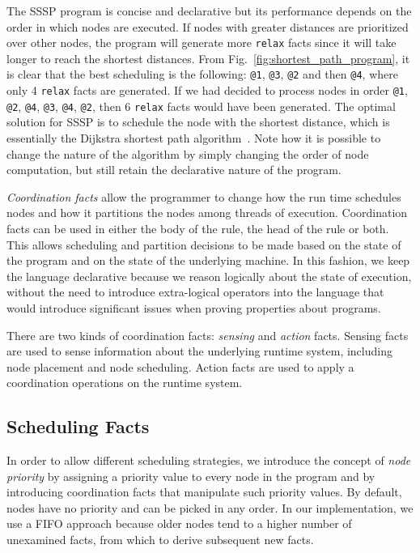 The SSSP program is concise and declarative but its performance depends on the order in which nodes are
executed. If nodes with greater distances are prioritized over other nodes, the
program will generate more \texttt{relax} facts since it will take longer to
reach the shortest distances. From Fig.~\ref{fig:shortest_path_program}, it is
clear that the best scheduling is the following: \texttt{@1},
\texttt{@3}, \texttt{@2} and then \texttt{@4}, where only 4 \texttt{relax}
facts are generated. If we had decided to process nodes in order
\texttt{@1}, \texttt{@2}, \texttt{@4}, \texttt{@3}, \texttt{@4},
\texttt{@2}, then 6 \texttt{relax} facts would have been generated.
The optimal solution for SSSP is to schedule the node with the
shortest distance, which is essentially the Dijkstra shortest path
algorithm~\cite{Dijkstra}. Note how it is possible to change the nature of
the algorithm by simply changing the order of node computation, but still
retain the declarative nature of the program.

\emph{Coordination facts} allow the programmer
to change how the run time schedules nodes and how it partitions the nodes among
threads of execution. Coordination facts can be used in either the body of the
rule, the head of the rule or both.
This allows scheduling and partition decisions to be made based on the state of
the program and on the state of the underlying machine.
In this fashion, we keep the language declarative because we reason logically
about the state of execution, without the need to introduce extra-logical
operators into the language that would introduce significant issues when proving
properties about programs.

There are two kinds of coordination facts: \emph{sensing} and \emph{action}
facts. Sensing facts are used to sense information about the
underlying runtime system, including node placement and node scheduling.
Action facts are used to apply a coordination operations on the runtime system.

\subsection{Scheduling Facts}\label{sec:fifo}

In order to allow different scheduling strategies, we introduce the concept of
\emph{node priority} by assigning a priority value to every node in the program
and by introducing coordination facts that manipulate such priority values.
By default, nodes have no priority and can be picked in any order. In
our implementation, we use a FIFO approach because
older nodes tend to a higher number of unexamined facts, from which to derive
subsequent new facts.

